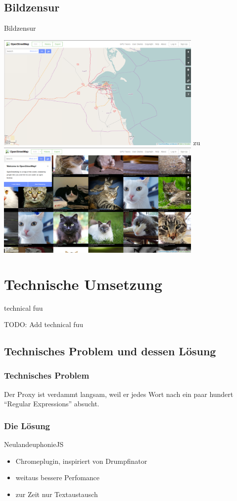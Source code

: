 \documentclass [xcolor=dvipsnames] {beamer}
\begin{document}
\subsection{Bildzensur}
\begin{frame}
	{\sc Bildzensur}
	\begin{center}
		{
			\includegraphics[width=10cm]{osm-1}
		}
		\only<2>
		{
			{\Large zu}
		}
		\only<3>
		{
			\includegraphics[width=10cm]{osm-mod-1}
		}
	\end{center}
\end{frame}

\section{Technische Umsetzung}
\begin{frame}
	{\sc technical fuu}
\end{frame}
\note
{
	{\Large TODO: Add technical fuu}
}

\subsection{Technisches Problem und dessen Lösung}
\begin{frame}
	\frametitle{\sc Technisches Problem}
	\begin{center}
		Der Proxy ist verdammt langsam, weil er jedes Wort nach ein paar hundert "`Regular Expressions"' absucht.
	\end{center}
\end{frame}
\begin{frame}
	\frametitle{\sc Die Lösung}
	\begin{center}
		{\Large NeulandeuphonieJS}
	\end{center}
	\begin{itemize}
		\item Chromeplugin, inspiriert von Drumpfinator
		\item weitaus bessere Perfomance
		\item zur Zeit nur Textaustausch
	\end{itemize}
\end{frame}
\end{document}
